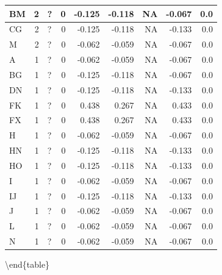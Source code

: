 \documentclass[
  letterpaper,
  DIV=11,
  numbers=noendperiod]{scrreprt}
\begin{document}
\begin{tabular}[t]{l|r|l|r|r|r|r|r|r}
\hline
\hspace{1em}BM & 2 & ? & 0 & -0.125 & -0.118 & NA & -0.067 & 0.0\\
\hline
\hspace{1em}CG & 2 & ? & 0 & -0.125 & -0.118 & NA & -0.133 & 0.0\\
\hline
\hspace{1em}M & 2 & ? & 0 & -0.062 & -0.059 & NA & -0.067 & 0.0\\
\hline
\hspace{1em}A & 1 & ? & 0 & -0.062 & -0.059 & NA & -0.067 & 0.0\\
\hline
\hspace{1em}BG & 1 & ? & 0 & -0.125 & -0.118 & NA & -0.067 & 0.0\\
\hline
\hspace{1em}DN & 1 & ? & 0 & -0.125 & -0.118 & NA & -0.133 & 0.0\\
\hline
\hspace{1em}FK & 1 & ? & 0 & 0.438 & 0.267 & NA & 0.433 & 0.0\\
\hline
\hspace{1em}FX & 1 & ? & 0 & 0.438 & 0.267 & NA & 0.433 & 0.0\\
\hline
\hspace{1em}H & 1 & ? & 0 & -0.062 & -0.059 & NA & -0.067 & 0.0\\
\hline
\hspace{1em}HN & 1 & ? & 0 & -0.125 & -0.118 & NA & -0.133 & 0.0\\
\hline
\hspace{1em}HO & 1 & ? & 0 & -0.125 & -0.118 & NA & -0.133 & 0.0\\
\hline
\hspace{1em}I & 1 & ? & 0 & -0.062 & -0.059 & NA & -0.067 & 0.0\\
\hline
\hspace{1em}IJ & 1 & ? & 0 & -0.125 & -0.118 & NA & -0.133 & 0.0\\
\hline
\hspace{1em}J & 1 & ? & 0 & -0.062 & -0.059 & NA & -0.067 & 0.0\\
\hline
\hspace{1em}L & 1 & ? & 0 & -0.062 & -0.059 & NA & -0.067 & 0.0\\
\hline
\hspace{1em}N & 1 & ? & 0 & -0.062 & -0.059 & NA & -0.067 & 0.0\\
\hline
\end{tabular}

\textbackslash end\{table\}
\end{document}
